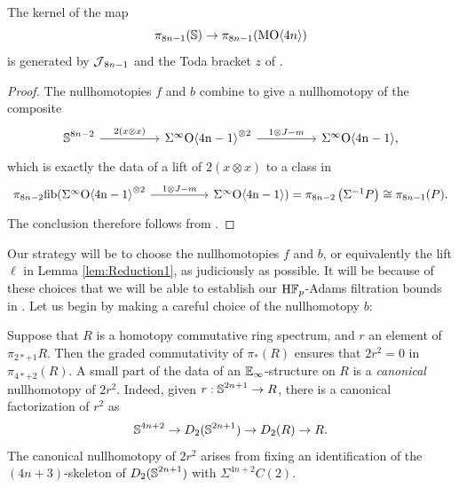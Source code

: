 \begin{lem} \label{lem:toda-basic}
The kernel of the map
$$\pi_{8n-1} (\mathbb{S}) \to \pi_{8n-1} (\operatorname{\mathrm{MO}} \langle 4n \rangle)$$
is generated by $\operatorname{\mathcal{J}}_{8n-1}$ and the Toda bracket $z$ of .
\end{lem}

\begin{proof}
The nullhomotopies $f$ and $b$ combine to give a nullhomotopy of the composite
$$
\begin{tikzcd}[column sep = huge]
\bS^{8n-2} \arrow{r}{2(x \otimes x)} & \sOf^{\otimes 2} \arrow{r}{1 \otimes J -m} & \sOf,
\end{tikzcd}
$$
which is exactly the data of a lift of $2(x \otimes x)$ to a class in
\[
\begin{tikzcd} [column sep = huge]
    \pi_{8n-2}\mathrm{fib}(\sOf^{\otimes 2} \arrow{r}{1 \otimes J - m} & \sOf) = \pi_{8n-2} \left( \Sigma^{-1} P \right) \cong \pi_{8n-1} (P).
\end{tikzcd}
\]
The conclusion therefore follows from .
\end{proof}

Our strategy will be to choose the nullhomotopies $f$ and $b$, or equivalently the lift $\ell$ in Lemma \ref{lem:Reduction1}, as judiciously as possible. It will be because of these choices that we will be able to establish our $\mathrm{H}\mathbb{F}_p$-Adams filtration bounds in . Let us begin by making a careful choice of the nullhomotopy $b$:

\begin{rec}
Suppose that $R$ is a homotopy commutative ring spectrum, and $r$ an element of $\pi_{2*+1} R$.  Then the graded commutativity of $\pi_*(R)$ ensures that $2r^2 =0$ in $\pi_{4*+2}(R)$.
  A small part of the data of an $\operatorname{\mathbb{E}}_\infty$-structure on $R$ is a \emph{canonical} nullhomotopy of $2r^2$.
  Indeed, given $r : \operatorname{\mathbb{S}}^{2n+1} \to R$, there is a canonical factorization of $r^2$ as
  \[\operatorname{\mathbb{S}}^{4n+2} \to D_2 (\operatorname{\mathbb{S}}^{2n+1}) \to D_2 (R) \to R.\]
  The canonical nullhomotopy of $2r^2$ arises from fixing an identification of the $(4n+3)$-skeleton of $D_2 (\operatorname{\mathbb{S}}^{2n+1})$ with $\Sigma^{4n+2} C(2)$.
\end{rec}

